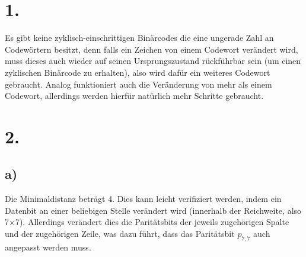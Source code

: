 \documentclass[a4paper]{scrartcl}
\title{\titleinfo}
\author{Tronje Krabbe 6435002, The-Vinh Jackie Huynh 6388888,\\Arne Struck 6326505}
\date{\today}
\begin{document}
\maketitle
\notag
\section{1.}
	Es gibt keine zyklisch-einschrittigen Binärcodes die eine ungerade Zahl an Codewörtern besitzt, 
	denn falls ein Zeichen von einem Codewort verändert wird, muss dieses auch wieder auf
	seinen Ursprungszustand rückführbar sein (um einen zyklischen Binärcode zu erhalten), also wird
	dafür ein weiteres Codewort gebraucht.
	Analog funktioniert auch die Veränderung von mehr als einem Codewort, allerdings werden hierfür 
	natürlich mehr Schritte gebraucht. 
	
\section{2.}
	\subsection{a)}
		Die Minimaldistanz beträgt 4. Dies kann leicht verifiziert werden, indem ein Datenbit an 
		einer beliebigen Stelle verändert wird (innerhalb der Reichweite, also 7\(\times\)7). 
		Allerdings verändert dies die Paritätsbits der jeweils zugehörigen Spalte und der zugehörigen
		Zeile, was dazu führt, dass das Paritätsbit \(p_{7,7}\) auch angepasst werden muss.
	
\end{document}
